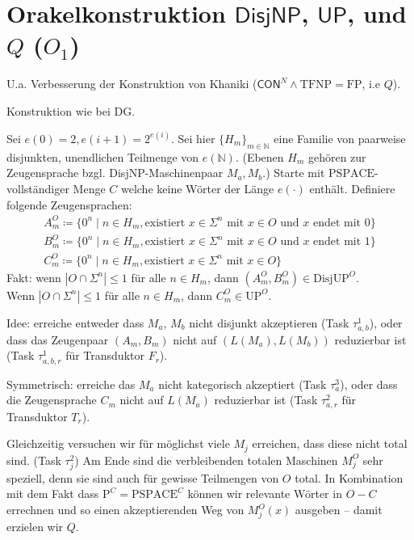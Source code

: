 \documentclass[nofonts]{uebung}
\theoremstyle{definition}
\def\P{\ensuremath{\mathrm{P}}}
\def\FP{\ensuremath{\mathrm{FP}}}
\def\UP{\ensuremath{\mathrm{UP}}}
\def\DisjUP{\ensuremath{\mathrm{DisjUP}}}
\def\TFNP{\ensuremath{\mathrm{TFNP}}}
\def\hUP{\ensuremath{\mathsf{UP}}}
\def\hDisjNP{\ensuremath{\mathsf{DisjNP}}}
\def\hCON{\ensuremath{\mathsf{CON}}}
\begin{document}
\renewcommand{\phi}{\varphi}


\section{Orakelkonstruktion $\hDisjNP$, $\hUP$, und $Q$ ($O_1$)}

U.a. Verbesserung der Konstruktion von Khaniki ($\hCON^N\land \TFNP=\FP$, i.e $Q$).

Konstruktion wie bei DG.

Sei $e(0)=2, e(i+1)=2^{e(i)}$. Sei hier $\{H_m\}_{m\in\mathbb N}$ eine Familie von paarweise disjunkten, unendlichen Teilmenge von $e(\mathbb N)$. (Ebenen $H_m$ gehören zur Zeugensprache bzgl. DisjNP-Maschinenpaar $M_a, M_b$.)
Starte mit $\mathrm{PSPACE}$-vollständiger Menge $C$ welche keine Wörter der Länge $e(\cdot)$ enthält.
Definiere folgende Zeugensprachen:
        \begin{gather*}
            A_m^O \coloneqq \{ 0^n \mid n\in H_m, \text{existiert $x\in \Sigma^{n}$ mit } x\in O \text{ und $x$ endet mit $0$} \}\\
            B_m^O \coloneqq \{ 0^n \mid n\in H_m, \text{existiert $x\in \Sigma^{n}$ mit } x\in O \text{ und $x$ endet mit $1$} \}\\
            C_m^O \coloneqq \{ 0^n \mid n\in H_m, \text{existiert $x\in \Sigma^{n}$ mit } x\in O  \}
        \end{gather*}
        Fakt: wenn $|O\cap \Sigma^{n}|\leq 1$ für alle $n\in H_m$, dann $(A_m^O, B_m^O)\in\DisjUP^O$.\\
        Wenn $|O\cap \Sigma^n|\leq 1$ für alle $n\in H_m$, dann $C_m^O \in \UP^O$.
\medskip

Idee: erreiche entweder dass $M_a$, $M_b$ nicht disjunkt akzeptieren (Task $\tau^1_{a,b}$), oder dass das Zeugenpaar $(A_m,B_m)$ nicht auf $(L(M_a),L(M_b))$ reduzierbar ist (Task $\tau^1_{a,b,r}$ für Transduktor $F_r$).

Symmetrisch: erreiche das $M_a$ nicht kategorisch akzeptiert (Task $\tau^3_{a}$), oder dass die Zeugensprache $C_m$ nicht auf $L(M_a)$ reduzierbar ist (Task $\tau^2_{a,r}$ für Transduktor $T_r$).

Gleichzeitig versuchen wir für möglichst viele $M_j$ erreichen, dass diese nicht total sind. (Task $\tau^2_j$)
Am Ende sind die verbleibenden totalen Maschinen $M^O_j$ sehr speziell, denn sie sind auch für gewisse Teilmengen von $O$ total.
In Kombination mit dem Fakt dass $\P^C=\mathrm{PSPACE}^C$ können wir relevante Wörter in $O-C$ errechnen und so einen akzeptierenden Weg von $M^O_j(x)$ ausgeben -- damit erzielen wir $Q$.
\medskip
\end{document}
